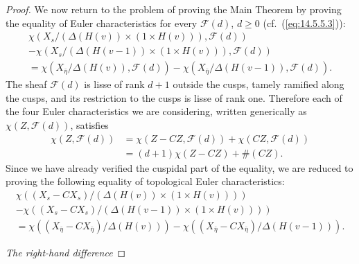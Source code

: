 \begin{proof}
\kmitem\label{item:14.5.8} We now return to the problem of proving the Main Theorem by proving the equality of Euler characteristics for every $\mathcal{F}(d)$, $d \ge 0$ (cf.~(\ref{eq:14.5.5.3})):
\begin{multline}\label{eq:14.5.8.1}
\chi(X_s / (\Delta(H(v)) \times (1 \times H(v))), \mathcal{F}(d)) \\
- \chi(X_s / (\Delta(H(v-1)) \times (1 \times H(v))), \mathcal{F}(d)) \\
= \chi(X_{\bar{\eta}} / \Delta(H(v)), \mathcal{F}(d)) - \chi(X_{\bar{\eta}} / \Delta(H(v-1)), \mathcal{F}(d)) .
\end{multline}
The sheaf $\mathcal{F}(d)$ is lisse of rank $d+1$ outside the cusps, tamely ramified along the cusps, and its restriction to the cusps is lisse of rank one. Therefore each of the four Euler characteristics we are considering, written generically as $\chi(Z, \mathcal{F}(d))$, satisfies
\begin{equation}\label{eq:14.5.8.2}
\begin{aligned}
\chi(Z, \mathcal{F}(d)) &= \chi(Z - CZ, \mathcal{F}(d)) + \chi(CZ, \mathcal{F}(d)) \\
&= (d+1) \chi(Z - CZ) + \#(CZ) .
\end{aligned}
\end{equation}
Since we have already verified the cuspidal part of the equality, we are reduced to proving the following equality of topological Euler characteristics:
\begin{multline}\label{eq:14.5.8.3}
\chi((X_s - CX_s) / (\Delta(H(v)) \times (1 \times H(v)))) \\
- \chi((X_s - CX_s) / (\Delta(H(v-1)) \times (1 \times H(v)))) \\
= \chi((X_{\bar{\eta}} - CX_{\bar{\eta}}) / \Delta(H(v))) - \chi((X_{\bar{\eta}} - CX_{\bar{\eta}}) / \Delta(H(v-1))) .
\end{multline}

\kmitem\label{item:14.5.9} \emph{The right-hand difference}


\end{proof}
